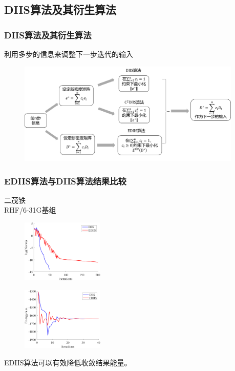 \documentclass[10pt,aspectratio=43,mathserif,UTF8]{beamer}
\begin{document}
\subsection{DIIS算法及其衍生算法}
\begin{frame}
	\frametitle{DIIS算法及其衍生算法}
	利用多步的信息来调整下一步迭代的输入
	
	\begin{figure}[htbp]
		\centering
		\includegraphics[width=0.95\textwidth]{figure/HF/DIIS2.png}
	\end{figure}

\end{frame}



\begin{frame}
	\frametitle{EDIIS算法与DIIS算法结果比较}
	二茂铁\\
	RHF/6-31G基组

	\begin{figure}[ht!]
		\centering
		\begin{minipage}{0.4\linewidth}
			\centering
			\includegraphics[height=3cm]{figure/ferrocene/logNorm3.png}
			\label{fig:ferrocene:lognorm}
		\end{minipage}
		\begin{minipage}{0.4\linewidth}
			\centering
			\includegraphics[height=3cm]{figure/ferrocene/E3.png}
			\label{fig:ferrocene:E}
		\end{minipage}
		\label{fig:ferrocene}
	\end{figure}
	\centerline{EDIIS算法可以有效降低收敛结果能量。}
\end{frame}
\end{document}
